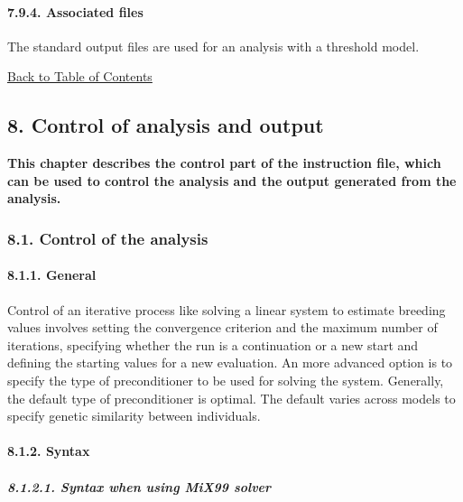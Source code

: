 \paragraph{7.9.4. Associated files}\label{Stat45}

The standard output files are used for an analysis with a threshold
model.

\hyperref[Tabl01]{Back to Table of Contents}

\newpage

\subsection{8. Control of analysis and output}\label{Cont01}

\textbf{This chapter describes the control part of the instruction file,
which can be used to control the analysis and the output generated from
the analysis.}

\subsubsection{8.1. Control of the analysis}\label{Cont02}

\paragraph{8.1.1. General}\label{Cont03}

Control of an iterative process like solving a linear system to estimate
breeding values involves setting the convergence criterion and the
maximum number of iterations, specifying whether the run is a
continuation or a new start and defining the starting values for a new
evaluation. An more advanced option is to specify the type of
preconditioner to be used for solving the system. Generally, the default
type of preconditioner is optimal. The default varies across models to
specify genetic similarity between individuals.

\paragraph{8.1.2. Syntax}\label{Cont04}

\subparagraph{8.1.2.1. Syntax when using MiX99 solver}\label{Cont05}


